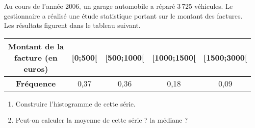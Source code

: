 
\begin{exercice}\label{exoSeconde-0036}

 Au cours de l'année 2006, un garage automobile a réparé 3\,725 véhicules. Le gestionnaire a réalisé une étude statistique portant sur le montant des factures. Les résultats figurent dans le tableau suivant.

 \begin{center}
 \begin{tabular}{|c||c|c|c|c|}
   \hline
   \textbf{Montant de la facture (en euros)} & [0;500[&[500;1000[&[1000;1500[&[1500;3000[\\
   \hline
   \textbf{Fréquence} & 0,37&0,36&0,18&0,09\\
   \hline
 \end{tabular}
     
 \end{center}


\begin{enumerate}
\item Construire l'histogramme de cette série.
\item Peut-on calculer la moyenne de cette série ? la médiane ?
\end{enumerate}


\end{exercice}
